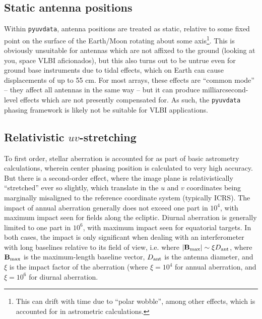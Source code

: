 \documentclass[11pt, oneside]{article}
\begin{document}
\subsection{Static antenna positions}
Within \texttt{pyuvdata}, antenna positions are treated as static, relative to some fixed point on the surface of the Earth/Moon rotating about some axis\footnote{This can drift with time due to ``polar wobble'', among other effects, which is accounted for in astrometric calculations.}. This is obviously unsuitable for antennas which are not affixed to the ground (looking at you, space VLBI aficionados), but this also turns out to be untrue even for ground base instruments due to tidal effects, which on Earth can cause displacements of up to 55 cm. For most arrays, these effects are ``common mode'' -- they affect all antennas in the same way -- but it can produce milliarcsecond-level effects which are not presently compensated for. As such, the \texttt{pyuvdata} phasing framework is likely not be suitable for VLBI applications.

\subsection{Relativistic $uv$-stretching}
To first order, stellar aberration is accounted for as part of basic astrometry calculations, wherein center phasing position is calculated to very high accuracy. But there is a second-order effect, where the image plane is relativistically ``stretched'' ever so slightly, which translate in the $u$ and $v$ coordinates being marginally misaligned to the reference coordinate system (typically ICRS). The impact of annual aberration generally does not exceed one part in $10^{4}$, with maximum impact seen for fields along the ecliptic. Diurnal aberration is generally limited to one part in $10^{6}$, with maximum impact seen for equatorial targets. In both cases, the impact is only significant when dealing with an interferometer with long baselines relative to its field of view, i.e. where $|\mathbf{B}_{\rm max}| \sim \xi D_{\rm ant}$, where $\mathbf{B}_{\rm max}$ is the maximum-length baseline vector, $D_{\rm ant}$ is the antenna diameter, and $\xi$ is the impact factor of the aberration (where $\xi=10^{4}$ for annual aberration, and $\xi=10^{6}$ for diurnal aberration.
\end{document}
